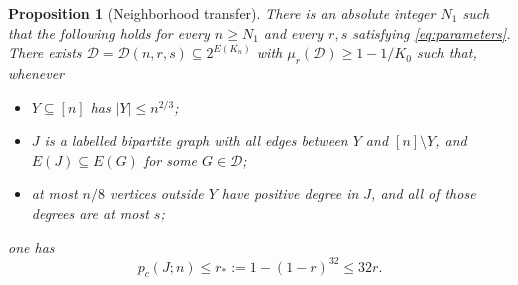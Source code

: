 \documentclass[11pt]{article}
\newtheorem{proposition}[theorem]{Proposition}
\theoremstyle{remark}
\numberwithin{equation}{section}
\newcommand{\calD}{\mathcal D}
\begin{document}
\begin{proposition}[Neighborhood transfer]\label{prop:transfer}
There is an absolute integer $N_1$ such that the following holds
for every $n\geq N_1$ and every $r,s$ satisfying
\eqref{eq:parameters}. There exists
$\calD=\calD(n,r,s)\subseteq2^{E(K_n)}$ with
$\mu_r(\calD)\geq1-1/K_0$ such that, whenever
\begin{itemize}
\item $Y\subseteq[n]$ has $|Y|\leq n^{2/3}$;
\item $J$ is a labelled bipartite graph with all edges between
      $Y$ and $[n]\setminus Y$, and $E(J)\subseteq E(G)$
      for some $G\in\calD$;
\item at most $n/8$ vertices outside $Y$ have positive degree in
      $J$, and all of those degrees are at most $s$;
\end{itemize}
one has
\begin{equation}\label{eq:transfer}
 p_c(J;n)\leq r_*:=1-(1-r)^{32}\leq32r.
\end{equation}
\end{proposition}
\end{document}
